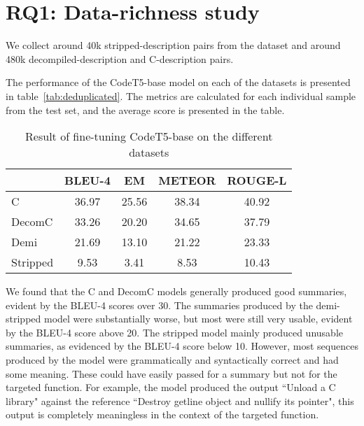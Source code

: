 \section{RQ1: Data-richness study}
We collect around 40k stripped-description pairs from the dataset and around 480k decompiled-description and C-description pairs. 

The performance of the CodeT5-base model on each of the datasets is presented in table~\ref{tab:deduplicated}. The metrics are calculated for each individual sample from the test set, and the average score is presented in the table.

\begin{table}[tbh]
\centering
\begin{tabular}{lcccc} 
\hline
\rowcolor[rgb]{0.761,0.761,0.761} \multicolumn{1}{|l}{\textbf{}} & BLEU-4 & EM    & METEOR & \multicolumn{1}{l|}{ROUGE-L}  \\ 
\hline
C                                                                          & 36.97  & 25.56 & 38.34  &  40.92                            \\
DecomC                                                                     & 33.26  & 20.20 & 34.65  & 37.79                             \\
Demi                                                                       & 21.69  & 13.10 & 21.22  &  23.33                             \\
Stripped                                                                   & 9.53   & 3.41  & 8.53  &  10.43                          
\end{tabular}
\caption{Result of fine-tuning CodeT5-base on the different datasets}
\label{tab:duplicated}
\end{table}

We found that the C and DecomC models generally produced good summaries, evident by the BLEU-4 scores over 30. The summaries produced by the demi-stripped model were substantially worse, but most were still very usable, evident by the BLEU-4 score above 20. The stripped model mainly produced unusable summaries, as evidenced by the BLEU-4 score below 10. However, most sequences produced by the model were grammatically and syntactically correct and had some meaning. These could have easily passed for a summary but not for the targeted function. For example, the model produced the output ``Unload a C library" against the reference ``Destroy getline object and nullify its pointer", this output is completely meaningless in the context of the targeted function.

